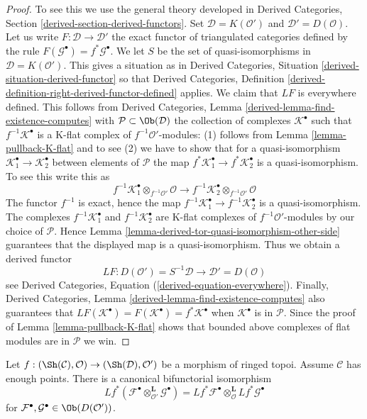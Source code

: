 \begin{proof}
To see this we use the general theory developed in
Derived Categories, Section \ref{derived-section-derived-functors}.
Set $\mathcal{D} = K(\mathcal{O}')$ and $\mathcal{D}' = D(\mathcal{O})$.
Let us write $F : \mathcal{D} \to \mathcal{D}'$ the exact functor
of triangulated categories defined by the rule
$F(\mathcal{G}^\bullet) = f^*\mathcal{G}^\bullet$.
We let $S$ be the set of quasi-isomorphisms in
$\mathcal{D} = K(\mathcal{O}')$.
This gives a situation as in
Derived Categories, Situation \ref{derived-situation-derived-functor}
so that
Derived Categories, Definition
\ref{derived-definition-right-derived-functor-defined}
applies. We claim that $LF$ is everywhere defined.
This follows from
Derived Categories, Lemma \ref{derived-lemma-find-existence-computes}
with $\mathcal{P} \subset \Ob(\mathcal{D})$ the collection
of complexes $\mathcal{K}^\bullet$ such that $f^{-1}\mathcal{K}^\bullet$
is a K-flat complex of $f^{-1}\mathcal{O}'$-modules: (1) follows from
Lemma \ref{lemma-pullback-K-flat}
and to see (2) we have to show that for a quasi-isomorphism
$\mathcal{K}_1^\bullet  \to \mathcal{K}_2^\bullet$ between
elements of $\mathcal{P}$ the map
$f^*\mathcal{K}_1^\bullet  \to f^*\mathcal{K}_2^\bullet$ is a
quasi-isomorphism. To see this write this as
$$
f^{-1}\mathcal{K}_1^\bullet \otimes_{f^{-1}\mathcal{O}'} \mathcal{O}
\longrightarrow
f^{-1}\mathcal{K}_2^\bullet \otimes_{f^{-1}\mathcal{O}'} \mathcal{O}
$$
The functor $f^{-1}$ is exact, hence the map
$f^{-1}\mathcal{K}_1^\bullet  \to f^{-1}\mathcal{K}_2^\bullet$ is a
quasi-isomorphism. The complexes
$f^{-1}\mathcal{K}_1^\bullet$ and $f^{-1}\mathcal{K}_2^\bullet$
are K-flat complexes of $f^{-1}\mathcal{O}'$-modules by our choice of
$\mathcal{P}$. Hence
Lemma \ref{lemma-derived-tor-quasi-isomorphism-other-side}
guarantees that the displayed map is a quasi-isomorphism.
Thus we obtain a derived functor
$$
LF :
D(\mathcal{O}') = S^{-1}\mathcal{D}
\longrightarrow
\mathcal{D}' = D(\mathcal{O})
$$
see
Derived Categories, Equation (\ref{derived-equation-everywhere}).
Finally,
Derived Categories, Lemma \ref{derived-lemma-find-existence-computes}
also guarantees that
$LF(\mathcal{K}^\bullet) = F(\mathcal{K}^\bullet) = f^*\mathcal{K}^\bullet$
when $\mathcal{K}^\bullet$ is in $\mathcal{P}$.
Since the proof of
Lemma \ref{lemma-pullback-K-flat}
shows that bounded above complexes of flat modules are in $\mathcal{P}$
we win.
\end{proof}

\begin{lemma}
\label{lemma-pullback-tensor-product}
Let $f : (\Sh(\mathcal{C}), \mathcal{O}) \to (\Sh(\mathcal{D}), \mathcal{O}')$
be a morphism of ringed topoi. Assume $\mathcal{C}$ has enough points.
There is a canonical bifunctorial isomorphism
$$
Lf^*(
\mathcal{F}^\bullet \otimes_{\mathcal{O}'}^{\mathbf{L}} \mathcal{G}^\bullet
) =
Lf^*\mathcal{F}^\bullet 
\otimes_{\mathcal{O}}^{\mathbf{L}}
Lf^*\mathcal{G}^\bullet 
$$
for $\mathcal{F}^\bullet, \mathcal{G}^\bullet \in \Ob(D(\mathcal{O}'))$.
\end{lemma}

